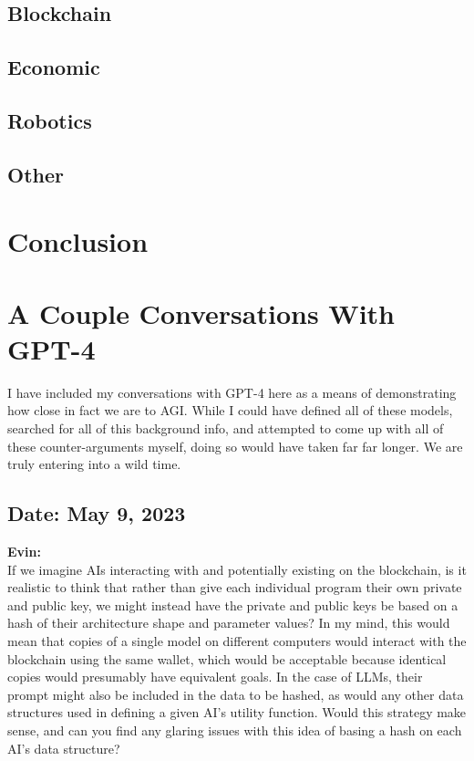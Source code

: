 \documentclass{article}[10pt]
\begin{document}
\subsection{Blockchain}
\subsection{Economic}
\subsection{Robotics}
\subsection{Other}







\section{Conclusion}



 


\newpage
\appendix


\section{A Couple Conversations With GPT-4}

I have included my conversations with GPT-4 here as a means of demonstrating how close in fact we are to AGI.
While I could have defined all of these models, searched for all of this background info, and attempted to come up with all of these counter-arguments myself, doing so would have taken far far longer.
We are truly entering into a wild time.\par


\subsection{Date: May 9, 2023}

\noindent\textbf{Evin:}\\
If we imagine AIs interacting with and potentially existing on the blockchain, is it realistic to think that rather than give each individual program their own private and public key, we might instead have the private and public keys be based on a hash of their architecture shape and parameter values? 
In my mind, this would mean that copies of a single model on different computers would interact with the blockchain using the same wallet, which would be acceptable because identical copies would presumably have equivalent goals. 
In the case of LLMs, their prompt might also be included in the data to be hashed, as would any other data structures used in defining a given AI's utility function. 
Would this strategy make sense, and can you find any glaring issues with this idea of basing a hash on each AI's data structure?\\
\end{document}
